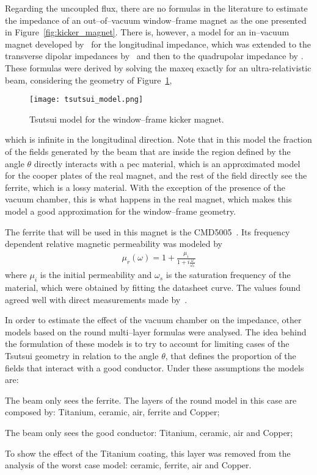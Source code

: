     Regarding the uncoupled flux, there are no formulas in the literature to estimate the impedance of an out--of--vacuum window--frame magnet as the one presented in Figure~\ref{fig:kicker_magnet}. There is, however, a model for an in--vacuum magnet developed by~ for the longitudinal impedance, which was extended to the transverse dipolar impedances by~ and then to the quadrupolar impedance by . These formulas were derived by solving the \gls{maxeq} exactly for an ultra-relativistic beam, considering the geometry of Figure~\ref{fig:tsutsui_model},
    \begin{figure}
        \centering
        \texttt{[image: tsutsui\_model.png]}
        \caption{Tsutsui model for the window--frame kicker magnet.}
        \label{fig:tsutsui_model}
    \end{figure}
    which is infinite in the longitudinal direction. Note that in this model the fraction of the fields generated by the beam that are inside the region defined by the angle $\theta$ directly interacts with a \gls{pec} material, which is an approximated model for the cooper plates of the real magnet, and the rest of the field directly see the ferrite, which is a lossy material. With the exception of the presence of the vacuum chamber, this is what happens in the real magnet, which makes this model a good approximation for the window--frame geometry.

    The ferrite that will be used in this magnet is the CMD5005~\cite{CeramicMagnets2017}. Its frequency dependent relative magnetic permeability was modeled by
    \begin{align}
        \mu_r(\omega) = 1 + \frac{\mu_i}{1+i\frac{\omega}{\omega_s}}
    \end{align}
    where $\mu_i$ is the initial permeability and $\omega_s$ is the saturation frequency of the material, which were obtained by fitting the datasheet curve. The values found agreed well with direct measurements made by~.

    In order to estimate the effect of the vacuum chamber on the impedance, other models based on the round multi--layer formulas were analysed. The idea behind the formulation of these models is to try to account for limiting cases of the Tsutsui geometry in relation to the angle $\theta$, that defines the proportion of the fields that interact with a good conductor. Under these assumptions the models are:
    \begin{description}[align=left]
        \item[Worst case (W):] The beam only sees the ferrite. The layers of the round model in this case are composed by: Titanium, ceramic, air, ferrite and Copper;
        \item[Best case (B):] The beam only sees the good conductor: Titanium, ceramic, air and Copper;
        \item[No Coating (NC):] To show the effect of the Titanium coating, this layer was removed from the analysis of the worst case model: ceramic, ferrite, air and Copper.
    \end{description}

